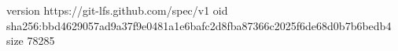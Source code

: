 version https://git-lfs.github.com/spec/v1
oid sha256:bbd4629057ad9a37f9e0481a1e6bafc2d8fba87366c2025f6de68d0b7b6bedb4
size 78285
